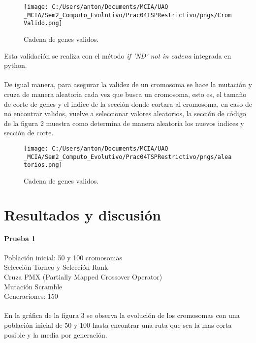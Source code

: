 \documentclass[10pt,letterpaper]{article}
\begin{document}
\begin{figure}[H]
	\centering
    \texttt{[image: C:/Users/anton/Documents/MCIA/UAQ \_MCIA/Sem2\_Computo\_Evolutivo/Prac04TSPRestrictivo/pngs/CromValido.png]}
    \caption{Cadena de genes validos.}
\end{figure}

Esta validación se realiza con el método \textit{if 'ND' not in cadena}  integrada en python.
\\\\
De igual manera, para asegurar la validez de un cromosoma se hace la mutación y cruza de manera aleatoria cada vez que busca un cromosoma, esto es, el tamaño de corte de genes y el indice de la sección donde cortara al cromosoma, en caso de no encontrar validos, vuelve a seleccionar valores aleatorios, la sección de código de la figura 2 muestra como determina de manera aleatoria los nuevos indices y sección de corte.

\begin{figure}[H]
	\centering
    \texttt{[image: C:/Users/anton/Documents/MCIA/UAQ \_MCIA/Sem2\_Computo\_Evolutivo/Prac04TSPRestrictivo/pngs/aleatorios.png]}
    \caption{Cadena de genes validos.}
\end{figure}

\section{Resultados y discusión}

\textbf{\large Prueba 1}
\\\\
Población inicial: 50 y 100 cromosomas\\
Selección Torneo y Selección Rank\\
Cruza PMX (Partially Mapped Crossover Operator)\\
Mutación Scramble\\
Generaciones: 150\\\\

En la gráfica de la figura 3 se observa la evolución de los cromosomas con una población inicial de 50 y 100 hasta encontrar una ruta que sea la mas corta posible y la media por generación.
\end{document}
